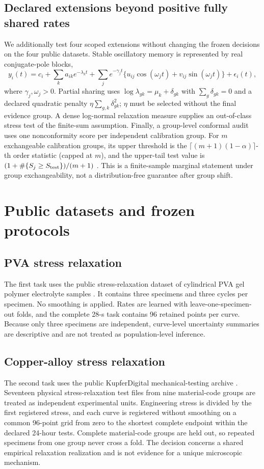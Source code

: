 \documentclass[11pt]{article}
\begin{document}
\subsection{Declared extensions beyond positive fully shared rates}
We additionally test four scoped extensions without changing the frozen decisions on the four public datasets. Stable oscillatory memory is represented by real conjugate-pole blocks,
\begin{equation}
y_i(t)=c_i+\sum_k a_{ik}e^{-\lambda_k t}+\sum_j e^{-\gamma_j t}\{u_{ij}\cos(\omega_jt)+v_{ij}\sin(\omega_jt)\}+\epsilon_i(t),
\label{eq:oscillatory-extension}
\end{equation}
where $\gamma_j,\omega_j>0$. Partial sharing uses $\log\lambda_{gk}=\mu_k+\delta_{gk}$ with $\sum_g\delta_{gk}=0$ and a declared quadratic penalty $\eta\sum_{g,k}\delta_{gk}^2$; $\eta$ must be selected without the final evidence group. A dense log-normal relaxation measure supplies an out-of-class stress test of the finite-sum assumption. Finally, a group-level conformal audit uses one nonconformity score per independent calibration group. For $m$ exchangeable calibration groups, its upper threshold is the $\lceil(m+1)(1-\alpha)\rceil$-th order statistic (capped at $m$), and the upper-tail test value is $(1+\#\{S_j\ge S_{\rm test}\})/(m+1)$ \cite{shafer2008conformal}. This is a finite-sample marginal statement under group exchangeability, not a distribution-free guarantee after group shift.
\section{Public datasets and frozen protocols}
\subsection{PVA stress relaxation}
The first task uses the public stress-relaxation dataset of cylindrical PVA gel polymer electrolyte samples \cite{schelkow2026pva}. It contains three specimens and three cycles per specimen. No smoothing is applied. Rates are learned with leave-one-specimen-out folds, and the complete 28-s task contains 96 retained points per curve. Because only three specimens are independent, curve-level uncertainty summaries are descriptive and are not treated as population-level inference.

\subsection{Copper-alloy stress relaxation}
The second task uses the public KupferDigital mechanical-testing archive \cite{kupferdigital2024relaxation}. Seventeen physical stress-relaxation test files from nine material-code groups are treated as independent experimental units. Engineering stress is divided by the first registered stress, and each curve is registered without smoothing on a common 96-point grid from zero to the shortest complete endpoint within the declared 24-hour tests. Complete material-code groups are held out, so repeated specimens from one group never cross a fold. The decision concerns a shared empirical relaxation realization and is not evidence for a unique microscopic mechanism.
\end{document}
